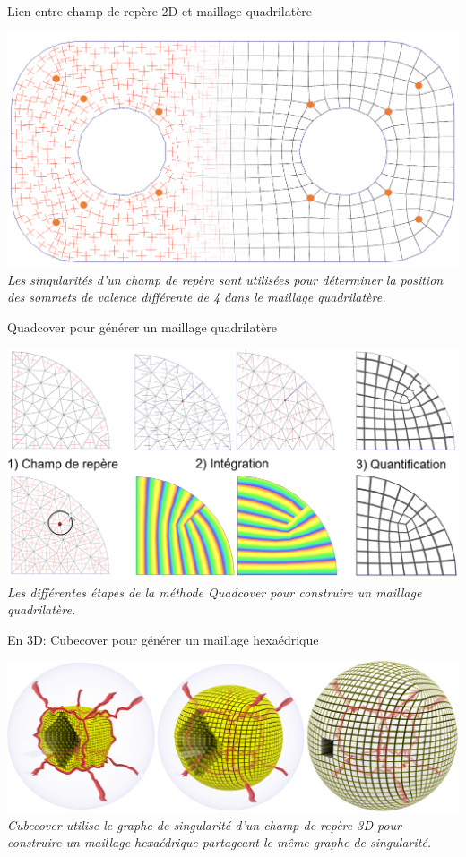 \begin{frame}{Lien entre champ de repère 2D et maillage quadrilatère}
    \begin{center}
        \includegraphics[width=\linewidth]{img/quadsimu/singus.PNG}
        \small{
            \textit{Les singularités d'un champ de repère sont utilisées pour déterminer la position des sommets de valence différente de 4 dans le maillage quadrilatère.}
        }
    \end{center}
\end{frame}
\begin{frame}{Quadcover pour générer un maillage quadrilatère}
    \begin{center}
        \includegraphics[width=\linewidth]{img/cubecover/pipeline.PNG}
        \small{
            \textit{Les différentes étapes de la méthode Quadcover pour construire un maillage quadrilatère.}
        }
    \end{center}
\end{frame}
\begin{frame}{En 3D: Cubecover pour générer un maillage hexaédrique}
    \begin{center}
        \includegraphics[width=\linewidth]{img/cubecover/B34_graphe_interieur.PNG}
        \small{
            \textit{Cubecover utilise le graphe de singularité d'un champ de repère 3D pour construire un maillage hexaédrique partageant le même graphe de singularité.}
        }
    \end{center}
\end{frame}